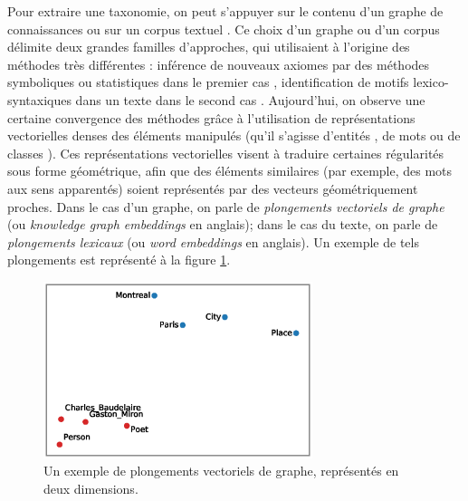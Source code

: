Pour extraire une taxonomie, on peut s'appuyer sur le contenu d'un graphe de connaissances \cite{cimiano2004conceptual, zhang2019new, volker2011statistical, zhang2019iteratively, ristoski2017large} ou sur un corpus textuel
\cite{wu2008automatically, shwartz-etal-2017-hypernyms, fu2014learning, gupta2016domain, atzori2020fully, pocostales-2016-nuig}. Ce choix d'un graphe ou d'un corpus délimite deux grandes familles d'approches, qui utilisaient à l'origine des méthodes très différentes :
inférence de nouveaux axiomes par des méthodes symboliques ou statistiques dans le premier cas \cite{cimiano2004conceptual, volker2011statistical},  identification de motifs lexico-syntaxiques dans un texte dans le second cas \cite{hearst1992automatic, roller-etal-2018-hearst}. Aujourd'hui, 
on observe une certaine convergence des méthodes grâce à l'utilisation de représentations vectorielles denses des éléments manipulés (qu'il s'agisse d'entités \cite{bordes2013translating}, de mots \cite{mikolov2013distributed} ou de classes \cite{lv2018differentiating}). Ces représentations vectorielles visent à traduire certaines régularités sous forme géométrique, afin que des éléments similaires (par exemple, des mots aux sens apparentés) soient représentés par des vecteurs géométriquement proches. Dans le cas d'un graphe, on parle de \textit{plongements vectoriels de graphe} (ou \textit{knowledge graph embeddings} en anglais); dans le cas du texte, on parle de \textit{plongements lexicaux} (ou \textit{word embeddings} en anglais). Un exemple de tels plongements est représenté à la figure \ref{fig:intro-embeddings}.

%

\begin{figure}[h]
    \centering
    \includegraphics[width=0.7\textwidth]{img/embedding_pca_transe2.eps}
    \caption[Exemple de plongements vectoriels]{
    Un exemple de plongements vectoriels de graphe, représentés en deux dimensions\footnotemark.}
    \label{fig:intro-embeddings}
\end{figure}

